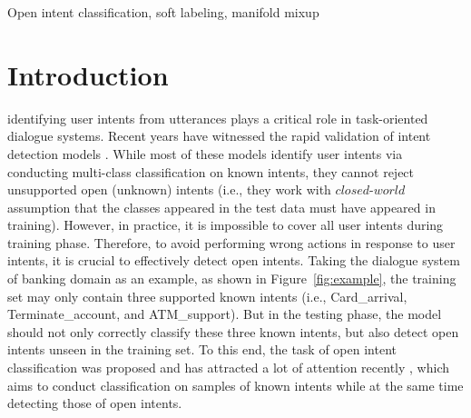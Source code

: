 \documentclass[journal]{IEEEtran}
\begin{document}
\begin{IEEEkeywords}
Open intent classification, soft labeling, manifold mixup
\end{IEEEkeywords}






%
\IEEEpeerreviewmaketitle



% 
% 
% 
% 


\section{Introduction}
 identifying user intents from utterances plays a critical role in task-oriented dialogue systems.
Recent years have witnessed the rapid validation of intent detection models \cite{DBLP:conf/emnlp/LiLQ18,DBLP:conf/acl/ENCS19,DBLP:conf/emnlp/QinCLWL19,DBLP:conf/acl/ZhangLDFY19,Qin21}.
While most of these models identify user intents via conducting multi-class classification on known intents, they cannot reject unsupported open (unknown) intents (i.e., they work with $closed$-$world$ assumption that the classes appeared in the test data must have appeared in training).
However, in practice, it is impossible to cover all user intents during training phase.
Therefore, to avoid performing wrong actions in response to user intents, it is crucial to effectively detect open intents.
Taking the dialogue system of banking domain as an example, as shown in Figure~\ref{fig:example}, the training set may only contain three supported known intents (i.e., Card\_arrival, Terminate\_account, and ATM\_support).
But in the testing phase, the model should not only correctly classify these three known intents, but also detect open intents unseen in the training set.
To this end, the task of open intent classification was proposed and has attracted a lot of attention recently \cite{Lin19,Yan20,DBLP:conf/emnlp/CavalinRAP20,DBLP:conf/coling/XuHYLLX20,zhang21,DBLP:conf/naacl/ZengHYXX21,Tan19,DBLP:conf/emnlp/LarsonMPCLHKLLT19,DBLP:journals/taslp/ZhengCH20,Zhang20}, which aims to conduct classification on samples of known intents while at the same time detecting those of open intents.
\end{document}
